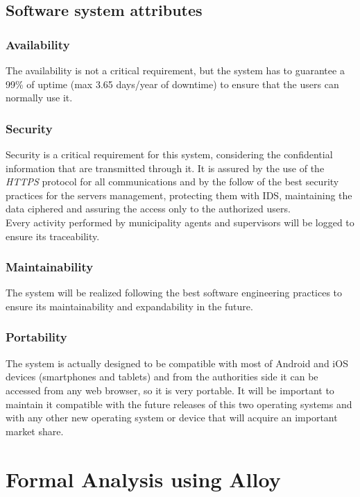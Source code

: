 \documentclass[a4paper]{report}
\begin{document}
\section{Software system attributes}
\subsection{Availability}
The availability is not a critical requirement, but the system has to guarantee a 99\% of uptime (max 3.65 days/year of downtime) to ensure that the users can normally use it.
\subsection{Security}
Security is a critical requirement for this system, considering the confidential information that are transmitted through it. It is assured by the use of the \textit{HTTPS} protocol for all communications and by the follow of the best security practices for the servers management, protecting them with IDS, maintaining the data ciphered and assuring the access only to the authorized users. \\
Every activity performed by municipality agents and supervisors will be logged to ensure its traceability.
\subsection{Maintainability}
The system will be realized following the best software engineering practices to ensure its maintainability and expandability in the future.
\subsection{Portability}
The system is actually designed to be compatible with most of Android and iOS devices (smartphones and tablets) and from the authorities side it can be accessed from any web browser, so it is very portable.
It will be important to maintain it compatible with the future releases of this two operating systems and with any other new operating system or device that will acquire an important market share.
\chapter{Formal Analysis using Alloy}
\end{document}
